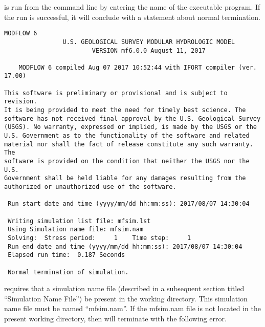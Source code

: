 \mf is run from the command line by entering the name of the \mf executable program.  If the run is successful, it will conclude with a statement about normal termination.

{\small
\begin{lstlisting}[style=modeloutput]
                                   MODFLOW 6
                U.S. GEOLOGICAL SURVEY MODULAR HYDROLOGIC MODEL
                        VERSION mf6.0.0 August 11, 2017

    MODFLOW 6 compiled Aug 07 2017 10:52:44 with IFORT compiler (ver. 17.00)

This software is preliminary or provisional and is subject to revision.
It is being provided to meet the need for timely best science. The
software has not received final approval by the U.S. Geological Survey
(USGS). No warranty, expressed or implied, is made by the USGS or the
U.S. Government as to the functionality of the software and related
material nor shall the fact of release constitute any such warranty. The
software is provided on the condition that neither the USGS nor the U.S.
Government shall be held liable for any damages resulting from the
authorized or unauthorized use of the software.

 Run start date and time (yyyy/mm/dd hh:mm:ss): 2017/08/07 14:30:04

 Writing simulation list file: mfsim.lst
 Using Simulation name file: mfsim.nam
 Solving:  Stress period:     1    Time step:     1
 Run end date and time (yyyy/mm/dd hh:mm:ss): 2017/08/07 14:30:04
 Elapsed run time:  0.187 Seconds

 Normal termination of simulation.
\end{lstlisting}
}

\noindent \mf requires that a simulation name file (described in a subsequent section titled ``Simulation Name File'') be present in the working directory.  This simulation name file must be named ``mfsim.nam''.  If the mfsim.nam file is not located in the present working directory, then \mf will terminate with the following error.  

